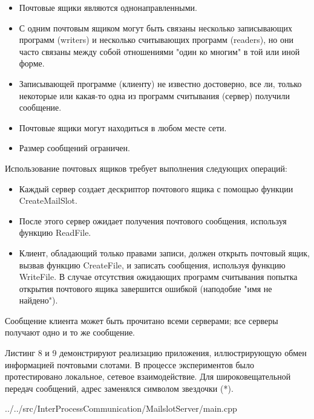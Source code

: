 \documentclass[a4paper, 12pt]{report}		%
\begin{document}
\begin{itemize}
\item Почтовые ящики являются однонаправленными.

\item С одним почтовым ящиком могут быть связаны несколько записывающих программ (writers) и несколько считывающих программ (readers), но они часто связаны между собой отношениями "один ко многим" в той или иной форме.

\item Записывающей программе (клиенту) не известно достоверно, все ли, только некоторые или какая-то одна из программ считывания (сервер) получили сообщение.

\item Почтовые ящики могут находиться в любом месте сети.

\item Размер сообщений ограничен.
\end{itemize}

Использование почтовых ящиков требует выполнения следующих операций:
\begin{itemize}
\item Каждый сервер создает дескриптор почтового ящика с помощью функции CreateMailSlot.

\item После этого сервер ожидает получения почтового сообщения, используя функцию ReadFile.

\item Клиент, обладающий только правами записи, должен открыть почтовый ящик, вызвав функцию CreateFile, и записать сообщения, используя функцию WriteFile. В случае отсутствия ожидающих программ считывания попытка открытия почтового ящика завершится ошибкой (наподобие "имя не найдено").
\end{itemize}

Сообщение клиента может быть прочитано всеми серверами; все серверы получают одно и то же сообщение.

Листинг 8 и 9 демонстрируют реализацию приложения, иллюстрирующую обмен информацией почтовыми слотами. В процессе экспериментов было протестировано локальное, сетевое взаимодействие\cite{Dushutina}. Для широковещательной передач сообщений, адрес заменялся символом звездочки (*).


{../../src/InterProcessCommunication/MailslotServer/main.cpp}
\end{document}
